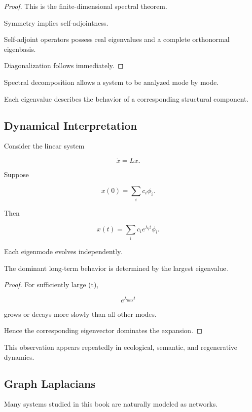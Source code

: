 \documentclass[12pt,twoside,openright]{book}
\newenvironment{prop}
{\begin{proposition}{}{}}
{\end{proposition}}
\begin{document}
\begin{proof}
This is the finite-dimensional spectral theorem.

Symmetry implies self-adjointness.

Self-adjoint operators possess real eigenvalues and a
complete orthonormal eigenbasis.

Diagonalization follows immediately.
\end{proof}

Spectral decomposition allows a system to be analyzed mode
by mode.

Each eigenvalue describes the behavior of a corresponding
structural component.

\subsection{Dynamical Interpretation}

Consider the linear system

\[
\dot x
=

Lx.
\]

Suppose

\[
x(0)
=

\sum_i
c_i\phi_i.
\]

Then

\[
x(t)
=

\sum_i
c_i
e^{\lambda_i t}
\phi_i.
\]

Each eigenmode evolves independently.

\begin{prop}
The dominant long-term behavior is determined by the
largest eigenvalue.
\end{prop}

\begin{proof}
For sufficiently large (t),

\[
e^{\lambda_{\max}t}
\]

grows or decays more slowly than all other modes.

Hence the corresponding eigenvector dominates the
expansion.
\end{proof}

This observation appears repeatedly in ecological,
semantic, and regenerative dynamics.

\subsection{Graph Laplacians}

Many systems studied in this book are naturally modeled as
networks.
\end{document}
